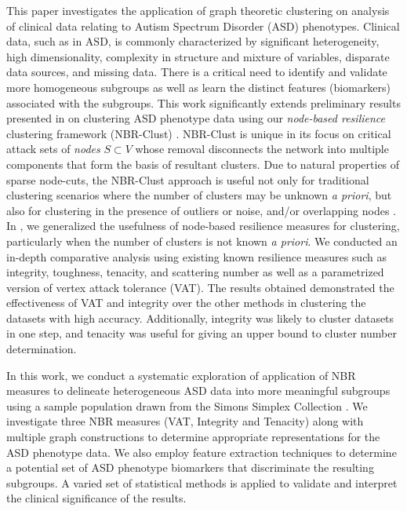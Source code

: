 \documentclass{bmcart}
\begin{document}
This paper investigates the application of graph theoretic clustering on analysis of clinical data relating to Autism Spectrum Disorder (ASD) phenotypes.
Clinical data, such as in ASD, is commonly characterized by significant heterogeneity, high dimensionality, complexity in structure and mixture of variables, disparate data sources, and missing data. There is a critical need to identify and validate more homogeneous subgroups as well as learn the distinct features (biomarkers) associated with the subgroups. This work significantly extends preliminary results presented in \cite{BICOB} on clustering ASD phenotype data using our \emph{node-based resilience} clustering framework (NBR-Clust) \cite{ICDM,FLAIRS}.
NBR-Clust is unique in its focus on critical attack sets of \emph{nodes} $S \subset V$ whose removal disconnects the network into multiple components that form the basis of resultant clusters.  Due to natural properties of sparse node-cuts, the NBR-Clust approach is useful not only for traditional clustering scenarios where the number of clusters may be unknown \textit{a priori}, but also for clustering in the presence of outliers or noise, and/or overlapping nodes \cite{ICDM,FLAIRS}. 
In \cite{ICDM}, we generalized the usefulness of node-based resilience measures for clustering, particularly when the number of clusters is not known \textit{a priori}. We conducted an in-depth comparative analysis using existing known resilience measures such as integrity, toughness, tenacity, and scattering number as well as a parametrized version of vertex attack tolerance (VAT). The results obtained demonstrated the effectiveness of VAT and integrity over the other methods in clustering the datasets with high accuracy.  Additionally, integrity was likely to cluster datasets in one step, and tenacity was useful for giving an upper bound to cluster number determination. 

In this work, we conduct a systematic exploration of application of NBR measures to delineate heterogeneous ASD data into more meaningful subgroups using a sample population drawn from the Simons Simplex Collection \cite{fischbach2010simons}. We investigate three NBR measures (VAT, Integrity and Tenacity) along with multiple graph constructions to determine appropriate representations for the ASD phenotype data. We also employ feature extraction techniques to determine a potential set of ASD phenotype biomarkers that discriminate the resulting subgroups. A varied set of statistical methods is applied to validate and interpret the clinical significance of the results.
\end{document}
